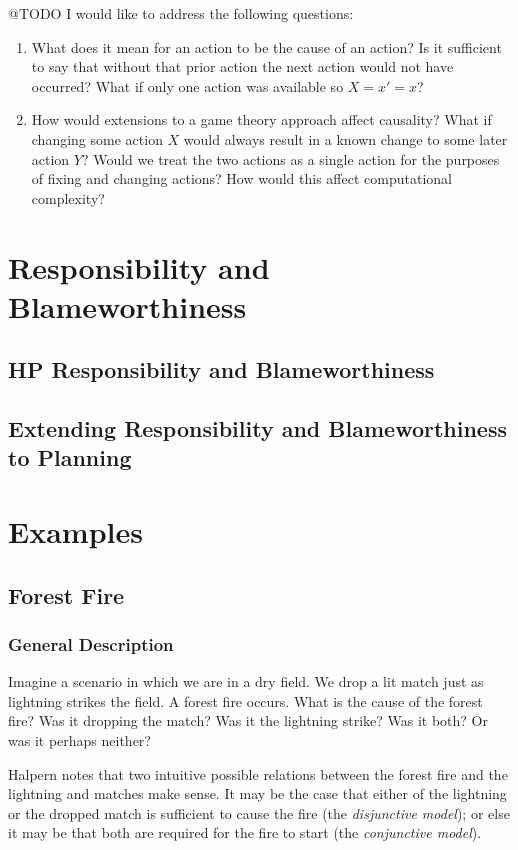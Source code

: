 \documentclass{article}
\theoremstyle{plain}
\theoremstyle{definition}
\begin{document}
@TODO I would like to address the following questions:

\begin{enumerate}
\item What does it mean for an action to be the cause of an action? Is it sufficient to say that without that prior action the next action would not have occurred? What if only one action was available so $X=x'=x$?
\item How would extensions to a game theory approach affect causality? What if changing some action $X$ would always result in a known change to some later action $Y$? Would we treat the two actions as a single action for the purposes of fixing and changing actions? How would this affect computational complexity?
\end{enumerate}



\section{Responsibility and Blameworthiness}
\subsection{HP Responsibility and Blameworthiness}
\subsection{Extending Responsibility and Blameworthiness to Planning}

\fi

\section{Examples}
\subsection{Forest Fire}
\subsubsection*{General Description}
Imagine a scenario in which we are in a dry field. We drop a lit match just as lightning strikes the field. A forest fire occurs. What is the cause of the forest fire? Was it dropping the match? Was it the lightning strike? Was it both? Or was it perhaps neither?

Halpern notes that two intuitive possible relations between the forest fire and the lightning and matches make sense. It may be the case that either of the lightning or the dropped match is sufficient to cause the fire (the \textit{disjunctive model}); or else it may be that both are required for the fire to start (the \textit{conjunctive model}).
\end{document}
